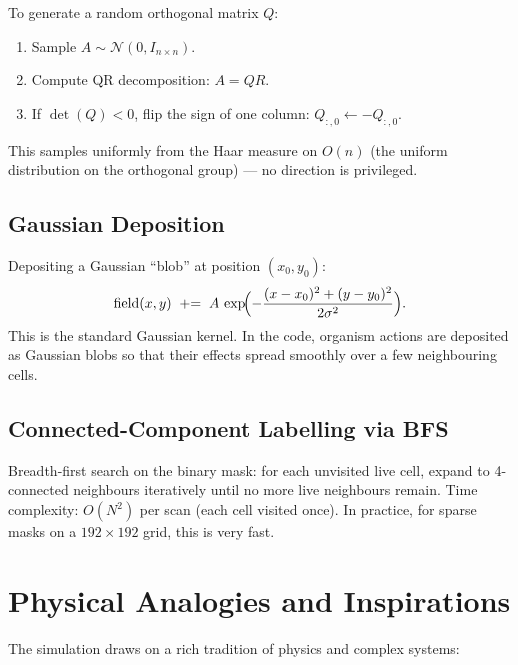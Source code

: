 \documentclass[12pt,a4paper]{article}
\begin{document}
To generate a random orthogonal matrix $Q$:
\begin{enumerate}[nosep]
  \item Sample $A \sim \mathcal{N}(0, I_{n\times n})$.
  \item Compute QR decomposition: $A = QR$.
  \item If $\det(Q) < 0$, flip the sign of one column: $Q_{:,0} \leftarrow -Q_{:,0}$.
\end{enumerate}
This samples uniformly from the Haar measure on $O(n)$
(the uniform distribution on the orthogonal group) —
no direction is privileged.

\subsection{Gaussian Deposition}

Depositing a Gaussian ``blob'' at position $(x_0, y_0)$:
\[
  \text{field}(x,y) \;\mathrel{+}=\;
  A\,\exp\!\Bigl(-\frac{(x-x_0)^2+(y-y_0)^2}{2\sigma^2}\Bigr).
\]
This is the standard Gaussian kernel.
In the code, organism actions are deposited as Gaussian blobs
so that their effects spread smoothly over a few neighbouring cells.

\subsection{Connected-Component Labelling via BFS}

Breadth-first search on the binary mask:
for each unvisited live cell, expand to 4-connected neighbours
iteratively until no more live neighbours remain.
Time complexity: $O(N^2)$ per scan (each cell visited once).
In practice, for sparse masks on a $192\times192$ grid,
this is very fast.

\section{Physical Analogies and Inspirations}

The simulation draws on a rich tradition of physics and
complex systems:
\end{document}
